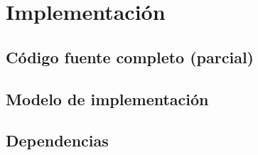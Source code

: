 \section{Implementación}
\subsection{Código fuente completo (parcial)}
\subsection{Modelo de implementación}
\subsection{Dependencias}